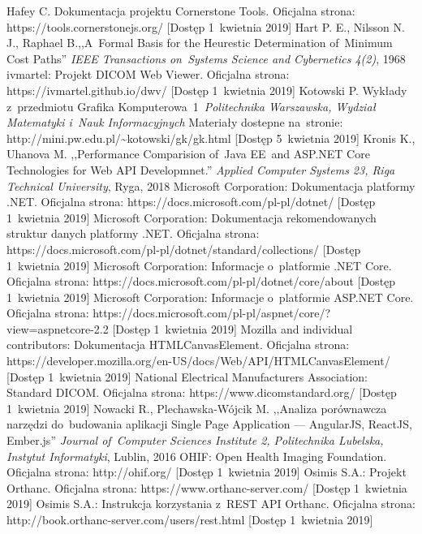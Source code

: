 \documentclass[a4paper,11pt,twoside,openright]{report}
\theoremstyle{definition}
\begin{document}
\begin{thebibliography}{24}
 Hafey C. Dokumentacja projektu Cornerstone Tools. Oficjalna strona: https://tools.cornerstonejs.org/ [Dostęp 1~kwietnia 2019]
 Hart P. E., Nilsson N. J., Raphael B.,,A~Formal Basis for the Heurestic Determination of~Minimum Cost Paths'' \emph{IEEE Transactions on~Systems Science and Cybernetics 4(2)}, 1968
 ivmartel: Projekt DICOM Web Viewer. Oficjalna strona: https://ivmartel.github.io/dwv/ [Dostęp 1~kwietnia 2019]
 Kotowski P. Wykłady z~przedmiotu Grafika Komputerowa~1~\emph{Politechnika Warszawska, Wydział Matematyki i~Nauk Informacyjnych} Materiały dostepne na~stronie: http://mini.pw.edu.pl/\textasciitilde kotowski/gk/gk.html [Dostęp 5~kwietnia 2019]
 Kronis K., Uhanova M. ,,Performance Comparision of~Java EE~and ASP.NET Core Technologies for Web API Developmnet.'' \emph{Applied Computer Systems 23, Riga Technical University}, Ryga, 2018
 Microsoft Corporation: Dokumentacja platformy .NET. Oficjalna strona: https://docs.microsoft.com/pl-pl/dotnet/ [Dostęp 1~kwietnia 2019]
 Microsoft Corporation: Dokumentacja rekomendowanych struktur danych platformy .NET. Oficjalna strona: https://docs.microsoft.com/pl-pl/dotnet/standard/collections/ [Dostęp 1~kwietnia 2019]
 Microsoft Corporation: Informacje o~platformie .NET Core. Oficjalna strona: https://docs.microsoft.com/pl-pl/dotnet/core/about [Dostęp 1~kwietnia 2019]
 Microsoft Corporation: Informacje o~platformie ASP.NET Core. Oficjalna strona: https://docs.microsoft.com/pl-pl/aspnet/core/?view=aspnetcore-2.2 [Dostęp 1~kwietnia 2019]
 Mozilla and individual contributors: Dokumentacja HTMLCanvasElement. Oficjalna strona: https://developer.mozilla.org/en-US/docs/Web/API/HTMLCanvasElement/ [Dostęp 1~kwietnia 2019]
 National Electrical Manufacturers Association: Standard DICOM. Oficjalna strona: https://www.dicomstandard.org/ [Dostęp 1~kwietnia 2019]
 Nowacki R., Plechawska-Wójcik M. ,,Analiza porównawcza narzędzi do~budowania aplikacji Single Page Application --- AngularJS, ReactJS, Ember.js'' \emph{Journal of~Computer Sciences Institute 2, Politechnika Lubelska, Instytut Informatyki}, Lublin, 2016
 OHIF: Open Health Imaging Foundation. Oficjalna strona: http://ohif.org/ [Dostęp 1~kwietnia 2019]
 Osimis S.A.: Projekt Orthanc. Oficjalna strona: https://www.orthanc-server.com/ [Dostęp 1~kwietnia 2019]
 Osimis S.A.: Instrukcja korzystania z~REST API Orthanc. Oficjalna strona: http://book.orthanc-server.com/users/rest.html [Dostęp 1~kwietnia 2019]

\end{thebibliography}
\end{document}
